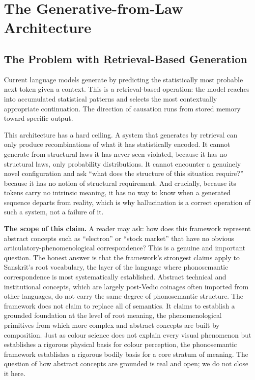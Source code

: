 \documentclass[12pt]{article}
\begin{document}
\section{The Generative-from-Law Architecture}

\subsection{The Problem with Retrieval-Based Generation}

Current language models generate by predicting the statistically most probable next token given a context. This is a retrieval-based operation: the model reaches into accumulated statistical patterns and selects the most contextually appropriate continuation. The direction of causation runs from stored memory toward specific output.

This architecture has a hard ceiling. A system that generates by retrieval can only produce recombinations of what it has statistically encoded. It cannot generate from structural laws it has never seen violated, because it has no structural laws, only probability distributions. It cannot encounter a genuinely novel configuration and ask ``what does the structure of this situation require?'' because it has no notion of structural requirement. And crucially, because its tokens carry no intrinsic meaning, it has no way to know when a generated sequence departs from reality, which is why hallucination is a correct operation of such a system, not a failure of it.

\textbf{The scope of this claim.} A reader may ask: how does this framework represent abstract concepts such as ``electron'' or ``stock market'' that have no obvious articulatory-phenomenological correspondence? This is a genuine and important question. The honest answer is that the framework's strongest claims apply to Sanskrit's root vocabulary, the layer of the language where phonosemantic correspondence is most systematically established. Abstract technical and institutional concepts, which are largely post-Vedic coinages often imported from other languages, do not carry the same degree of phonosemantic structure. The framework does not claim to replace all of semantics. It claims to establish a grounded foundation at the level of root meaning, the phenomenological primitives from which more complex and abstract concepts are built by composition. Just as colour science does not explain every visual phenomenon but establishes a rigorous physical basis for colour perception, the phonosemantic framework establishes a rigorous bodily basis for a core stratum of meaning. The question of how abstract concepts are grounded is real and open; we do not close it here.
\end{document}
